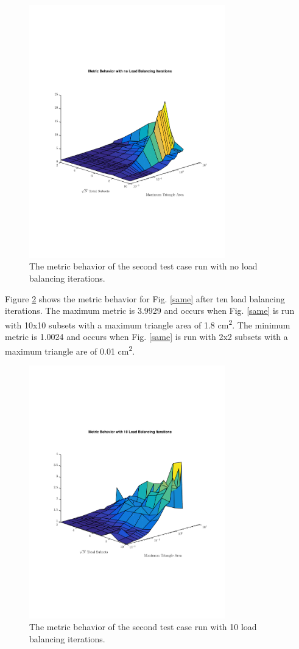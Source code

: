 \documentclass{anstrans}
\begin{document}
\begin{figure}
\centering
\includegraphics[width=85mm, trim = 2cm 5cm 0cm 5cm,clip]{figures/SameNoIter.pdf}
\caption{The metric behavior of the second test case run with no load balancing iterations.}
\label{samenoiter}
\end{figure}

Figure \ref{sameiter} shows the metric behavior for Fig. \ref{same} after ten load balancing iterations. The maximum metric is 3.9929 and occurs when Fig. \ref{same} is run with 10x10 subsets with a maximum triangle area of 1.8 cm\textsuperscript{2}. The minimum metric is 1.0024 and occurs when Fig. \ref{same} is run with 2x2 subsets with a maximum triangle are of 0.01 cm\textsuperscript{2}.

\begin{figure}
\centering
\includegraphics[width=85mm, trim = 2cm 5cm 0cm 5cm,clip]{figures/SameIter.pdf}
\caption{The metric behavior of the second test case run with 10 load balancing iterations.}
\label{sameiter}
\end{figure}
\end{document}
